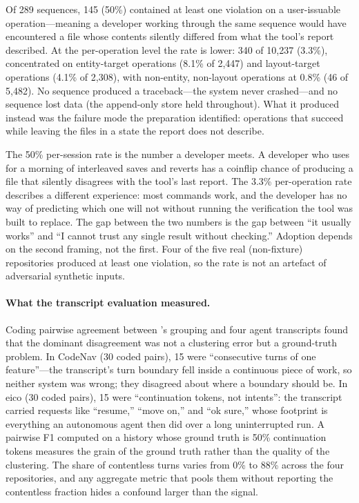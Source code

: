 Of 289 sequences, 145 (50\%) contained at least one violation on a
user-issuable operation---meaning a developer working through the same sequence
would have encountered a file whose contents silently differed from what the
tool's report described. At the per-operation level the rate is lower: 340 of
10{,}237 (3.3\%), concentrated on entity-target operations (8.1\% of 2{,}447)
and layout-target operations (4.1\% of 2{,}308), with non-entity, non-layout
operations at 0.8\% (46 of 5{,}482). No sequence produced a traceback---the
system never crashed---and no sequence lost data (the append-only store held
throughout). What it produced instead was the failure mode the preparation
identified: operations that succeed while leaving the files in a state the
report does not describe.

The 50\% per-session rate is the number a developer meets. A developer who uses
\sgt{} for a morning of interleaved saves and reverts has a coinflip chance
of producing a file that silently disagrees with the tool's last report. The
3.3\% per-operation rate describes a different experience: most commands work,
and the developer has no way of predicting which one will not without running
the verification the tool was built to replace. The gap between the two numbers
is the gap between ``it usually works'' and ``I cannot trust any single result
without checking.'' Adoption depends on the second framing, not the first. Four of the five
real (non-fixture) repositories produced at least one violation, so the rate
is not an artefact of adversarial synthetic inputs.

\paragraph{What the transcript evaluation measured.}
Coding pairwise agreement between \sgt{}'s grouping and four agent transcripts
found that the dominant disagreement was not a clustering error but a
ground-truth problem. In CodeNav (30 coded pairs), 15 were ``consecutive turns
of one feature''---the transcript's turn boundary fell inside a continuous piece
of work, so neither system was wrong; they disagreed about where a boundary
should be. In eico (30 coded pairs), 15 were ``continuation tokens, not
intents'': the transcript carried requests like ``resume,'' ``move on,'' and
``ok sure,'' whose footprint is everything an autonomous agent then did over a
long uninterrupted run. A pairwise F1 computed on a history whose ground truth
is 50\% continuation tokens measures the grain of the ground truth rather than
the quality of the clustering. The share of contentless turns varies from 0\%
to 88\% across the four repositories, and any aggregate metric that pools them
without reporting the contentless fraction hides a confound larger than the
signal.


